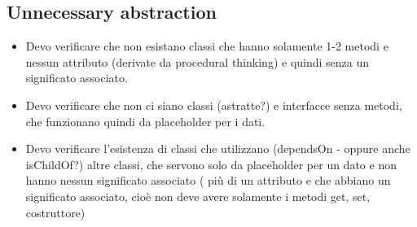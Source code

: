 \subsection{Unnecessary abstraction}

\begin{itemize}
    \item Devo verificare che non esistano classi che hanno solamente 1-2 metodi e nessun attributo (derivate da procedural thinking) e quindi senza un significato associato.
    \item Devo verificare che non ci siano classi (astratte?) e interfacce senza metodi, che funzionano quindi da placeholder per i dati. 
    \item Devo verificare l'esistenza di classi che utilizzano (dependsOn - oppure anche isChildOf?) altre classi, che servono solo da placeholder per un dato e non hanno nessun significato associato ( più di un attributo e che abbiano un significato associato, cioè non deve avere solamente i metodi get, set, costruttore)
\end{itemize}



%